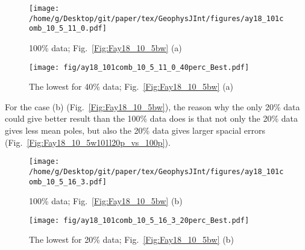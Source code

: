 \begin{figure*}[tbp]
  \captionsetup[subfigure]{labelformat=empty,aboveskip=-6pt,belowskip=-6pt}
  \centering
  \begin{subfigure}[htbp]{.49\textwidth}
    \captionsetup{skip=0pt}  %
    \centering
    \texttt{[image: /home/g/Desktop/git/paper/tex/GeophysJInt/figures/ay18\_101comb\_10\_5\_11\_0.pdf]}
	\caption{100\% data; Fig.~\ref{Fig:Fay18_10_5bw}
	(a)}\label{Fig:Fay18_10_5b101}
  \end{subfigure}
  \begin{subfigure}[htbp]{.49\textwidth}
    \captionsetup{skip=0pt}
    \centering
    \texttt{[image: fig/ay18\_101comb\_10\_5\_11\_0\_40perc\_Best.pdf]}
    \caption{The lowest for 40\% data;
	Fig.~\ref{Fig:Fay18_10_5bw} (a)}\label{Fig:Fay18_10_5b101l40p}
  \end{subfigure}
  \caption[Less data, better similarity?]{Comparing the 100\% North American
  120 Ma paleomagnetic data derived result with the best of the only
  40\% data (giving even better similarity) derived results (the green dot in
  Fig.~\ref{Fig:Fay18_10_5bw} (a)).}\label{Fig:Fay18_10_5b101l40p_vs_100p}
\end{figure*}

For the case (b) (Fig.~\ref{Fig:Fay18_10_5bw}), the reason why the only 20\%
data could give better result than the 100\% data does is that not only the
20\% data gives less mean poles, but also the 20\% data gives larger spacial
errors (Fig.~\ref{Fig:Fay18_10_5w101l20p_vs_100p}).

\begin{figure*}[tbp]
  \captionsetup[subfigure]{labelformat=empty,aboveskip=-6pt,belowskip=-6pt}
  \centering
  \begin{subfigure}[htbp]{.49\textwidth}
    \captionsetup{skip=0pt}
    \centering
    \texttt{[image: /home/g/Desktop/git/paper/tex/GeophysJInt/figures/ay18\_101comb\_10\_5\_16\_3.pdf]}
	\caption{100\% data; Fig.~\ref{Fig:Fay18_10_5bw}
	(b)}\label{Fig:Fay18_10_5w101}
  \end{subfigure}
  \begin{subfigure}[htbp]{.49\textwidth}
    \captionsetup{skip=0pt}
    \centering
    \texttt{[image: fig/ay18\_101comb\_10\_5\_16\_3\_20perc\_Best.pdf]}  %
    \caption{The lowest for 20\% data;
	Fig.~\ref{Fig:Fay18_10_5bw} (b)}\label{Fig:Fay18_10_5w101l20p}
  \end{subfigure}
  \caption[Less data, better similarity?]{Comparing the 100\% North American
  120 Ma paleomagnetic data derived result with the best of the only
  20\% data (giving even better similarity) derived results (the green dot in
  Fig.~\ref{Fig:Fay18_10_5bw} (b)).}\label{Fig:Fay18_10_5w101l20p_vs_100p}
\end{figure*}

